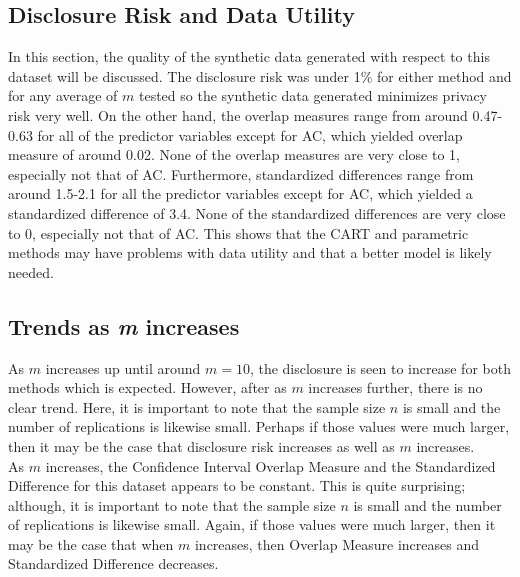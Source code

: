 \documentclass[12pt]{article}
\begin{document}
\subsection*{Disclosure Risk and Data Utility}
In this section, the quality of the synthetic data generated with respect to this dataset will be discussed. The disclosure risk was under 1\% for either method and for any average of $m$ tested so the synthetic data generated minimizes privacy risk very well.
On the other hand, the overlap measures range from around 0.47-0.63 for all of the predictor variables except for AC, which yielded overlap measure of around 0.02. None of the overlap measures are very close to 1, especially not that of AC. Furthermore, standardized differences range from around 1.5-2.1 for all the predictor variables except for AC, which yielded a standardized difference of 3.4. None of the standardized differences are very close to 0, especially not that of AC. This shows that the CART and parametric methods may have problems with data utility and that a better model is likely needed.

\subsection*{Trends as \textit{m} increases}
As $m$ increases up until around $m=10$, the disclosure is seen to increase for both methods which is expected. However, after as $m$ increases further, there is no clear trend. Here, it is important to note that the sample size $n$ is small and the number of replications is likewise small. Perhaps if those values were much larger, then it may be the case that disclosure risk increases as well as $m$ increases.\\
As $m$ increases, the Confidence Interval Overlap Measure and the Standardized Difference for this dataset appears to be constant. This is quite surprising; although, it is important to note that the sample size $n$ is small and the number of replications is likewise small. Again, if those values were much larger, then it may be the case that when $m$ increases, then Overlap Measure increases and Standardized Difference decreases.
\end{document}
